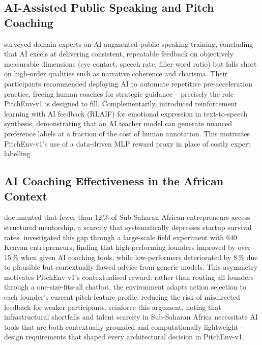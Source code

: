 \documentclass{article}
\begin{document}
\FloatBarrier
\subsection{AI-Assisted Public Speaking and Pitch Coaching}

\citet{fourati2025public} surveyed domain experts on AI-augmented
public-speaking training, concluding that AI excels at delivering
consistent, repeatable feedback on objectively measurable dimensions
(eye contact, speech rate, filler-word ratio) but falls short on
high-order qualities such as narrative coherence and charisma.
Their participants recommended deploying AI to automate repetitive
pre-acceleration practice, freeing human coaches for strategic
guidance -- precisely the role PitchEnv-v1 is designed to fill.
Complementarily, \citet{nagaram2024rlaif} introduced reinforcement
learning with AI feedback (RLAIF) for emotional expression in
text-to-speech synthesis, demonstrating that an AI teacher model can
generate nuanced preference labels at a fraction of the cost of human
annotation. This motivates PitchEnv-v1's use of a data-driven MLP
reward proxy in place of costly expert labelling.

\FloatBarrier
\subsection{AI Coaching Effectiveness in the African Context}

\citet{gem2022africa} documented that fewer than 12\,\% of Sub-Saharan
African entrepreneurs access structured mentorship, a scarcity that
systematically depresses startup survival rates.
\citet{otis2024ai} investigated this gap through a large-scale field
experiment with 640 Kenyan entrepreneurs, finding that high-performing
founders improved by over 15\,\% when given AI coaching tools, while
low-performers deteriorated by 8\,\% due to plausible but contextually
flawed advice from generic models. This asymmetry motivates
PitchEnv-v1's contextualised reward: rather than routing all founders
through a one-size-fits-all chatbot, the environment adapts action
selection to each founder's current pitch-feature profile, reducing
the risk of misdirected feedback for weaker participants.
\citet{rambe2026africa} reinforce this argument, noting that
infrastructural shortfalls and talent scarcity in Sub-Saharan Africa
necessitate AI tools that are both contextually grounded and
computationally lightweight -- design requirements that shaped every
architectural decision in PitchEnv-v1.
\end{document}
